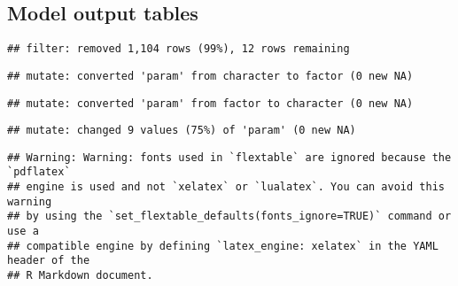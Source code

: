 \documentclass[
]{article}
\begin{document}
\hypertarget{model-output-tables}{%
\subsection{Model output tables}\label{model-output-tables}}

\begin{verbatim}
## filter: removed 1,104 rows (99%), 12 rows remaining
\end{verbatim}

\begin{verbatim}
## mutate: converted 'param' from character to factor (0 new NA)
\end{verbatim}

\begin{verbatim}
## mutate: converted 'param' from factor to character (0 new NA)
\end{verbatim}

\begin{verbatim}
## mutate: changed 9 values (75%) of 'param' (0 new NA)
\end{verbatim}

\begin{verbatim}
## Warning: Warning: fonts used in `flextable` are ignored because the `pdflatex`
## engine is used and not `xelatex` or `lualatex`. You can avoid this warning
## by using the `set_flextable_defaults(fonts_ignore=TRUE)` command or use a
## compatible engine by defining `latex_engine: xelatex` in the YAML header of the
## R Markdown document.
\end{verbatim}

\providecommand{\docline}[3]{\noalign{\global\setlength{\arrayrulewidth}{#1}}\arrayrulecolor[HTML]{#2}\cline{#3}}

\setlength{\tabcolsep}{8pt}

\renewcommand*{\arraystretch}{1.5}
\end{document}
